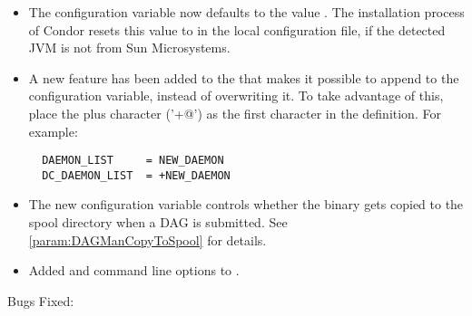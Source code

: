 \begin{itemize}

\item The configuration variable  now
defaults to the value .  The installation process of
Condor resets this value to  in the local
configuration file, if the detected JVM is not from Sun Microsystems.

\item A new feature has been added to the  that makes
it possible to append to the  configuration
variable, instead of overwriting it.  To take advantage of this, place
the plus character ('\verb@+@') as the first character in the
 definition.  For example:
\begin{verbatim}
  DAEMON_LIST     = NEW_DAEMON
  DC_DAEMON_LIST  = +NEW_DAEMON
\end{verbatim}

\item The new configuration variable 
controls whether the  binary gets copied to the spool
directory when a DAG is submitted.  See \ref{param:DAGManCopyToSpool}
for details.

\item Added  and  command line options to
.

\end{itemize}

\noindent Bugs Fixed:

